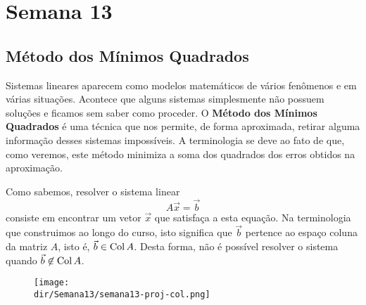 \documentclass[../livro.tex]{subfiles}  %
\providecommand{\dir}{..}
\begin{document}


\chapter{Semana 13}


\section{Método dos Mínimos Quadrados}

Sistemas lineares aparecem como modelos matemáticos de vários fenômenos e em várias situações. Acontece que alguns sistemas simplesmente não possuem soluções e ficamos sem saber como proceder. O \textbf{Método dos Mínimos Quadrados} é uma técnica que nos permite, de forma aproximada, retirar alguma informação desses sistemas impossíveis. A terminologia se deve ao fato de que, como veremos, este método minimiza a soma dos quadrados dos erros obtidos na aproximação.

Como sabemos, resolver o sistema linear
\begin{equation}
A \vec{x} = \vec{b}
\end{equation} consiste em encontrar um vetor $\vec{x}$ que satisfaça a esta equação. Na terminologia que construimos ao longo do curso, isto significa que $\vec{b}$ pertence ao espaço coluna da matriz $A$, isto é, $\vec{b} \in \operatorname{Col} A$. Desta forma, não é possível resolver o sistema quando $\vec{b} \not\in \operatorname{Col} A$. 
\begin{figure}[h!]
  \begin{center}
    \texttt{[image: \\dir/Semana13/semana13-proj-col.png]}
  \end{center}
\end{figure}
\end{document}
